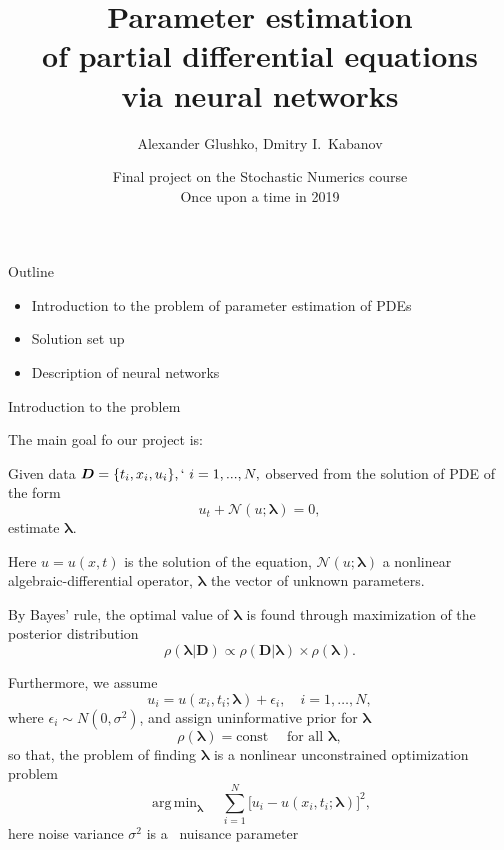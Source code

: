 \documentclass{beamer}
\title{Parameter estimation\\of partial differential equations\\via neural networks}
\author{Alexander Glushko, Dmitry I.\ Kabanov}
\date{Final project on the Stochastic Numerics course\\Once upon a time in 2019}
\newcommand{\Data}{\vec{D}}
\renewcommand{\vec}[1]{\boldsymbol{#1}}
\newcommand{\VLambda}{\ensuremath{\vec{\lambda}}}
\DeclareMathOperator*{\argmin}{arg\,min}
\newcommand{\NonlinOp}{\mathcal N\!}
\begin{document}
\maketitle

\begin{frame}{Outline}
\begin{itemize}
    \item Introduction to the problem of parameter estimation of PDEs
    \item Solution set up
    \item Description of neural networks
\end{itemize}
\end{frame}

\begin{frame}{Introduction to the problem}

The main goal fo our project is:

Given data $\vec{D} = \{t_i, x_i, u_i\},`~i = 1, ..., N,$ observed from the solution of PDE of the form
\begin{equation*}
    \label{eq:pde}
    u_t + \mathcal N\!(u; \VLambda) = 0,
\end{equation*}
estimate $\VLambda$.

Here $u=u(x, t)$ is the solution of the equation,
$\NonlinOp(u; \VLambda)$ a nonlinear algebraic-differential operator,
$\VLambda$ the vector of unknown parameters.

\end{frame}

\begin{frame}

By Bayes' rule, the optimal value of $\VLambda$ is found through
maximization of the posterior distribution \cite{sivia2006data}
\begin{equation*}
    \rho( \VLambda | \Data ) \propto
    \rho( \Data | \VLambda ) \times \rho( \VLambda ).
\end{equation*}

Furthermore, we assume
\begin{equation*}
    u_i = u(x_i, t_i; \VLambda) + \epsilon_i, \quad i=1, \dots, N,
\end{equation*}
where $\epsilon_i \sim N(0, \sigma^2)$, and assign uninformative prior for $\VLambda$
\begin{equation*}
    \rho(\vec{\lambda}) = \text{const} \quad \text{ for all } \vec{\lambda},
\end{equation*}
so that, the problem of finding $\VLambda$ is a nonlinear unconstrained
optimization problem
\begin{equation*}
    \label{eq:optim-ideal}
    \argmin_{\VLambda} \quad 
    \sum_{i=1}^{N} \big[ u_i - u(x_i, t_i; \VLambda) \big]^2,
\end{equation*}
here noise variance $\sigma^2$ is a~
nuisance parameter~\cite[section~8.2]{sivia2006data}
    
\end{frame}
\end{document}
